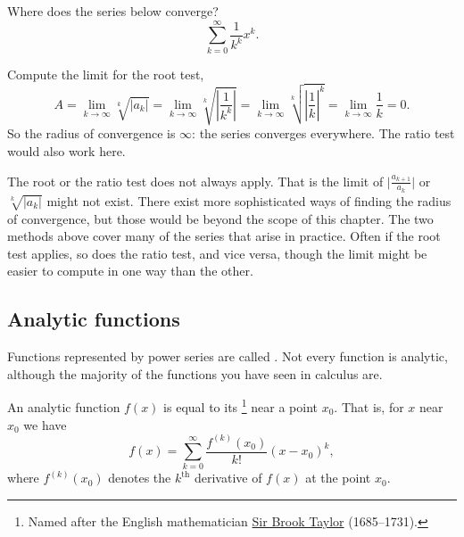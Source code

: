 \documentclass{ximera}
\begin{document}
\begin{example}
    Where does the series below converge?
    \begin{equation*}
        \sum_{k=0}^\infty \frac{1}{k^k} {x}^k .
    \end{equation*}
\end{example}

\begin{exampleSol}
    Compute the limit for the root test,
    \begin{equation*}
        A = \lim_{k\to\infty} \sqrt[k]{\lvert a_k \rvert} = \lim_{k\to\infty} \sqrt[k]{ \left\lvert\frac{1}{k^k}\right\rvert} 
        = \lim_{k\to\infty} \sqrt[k]{ {\left\lvert\frac{1}{k}\right\rvert}^{k}} = \lim_{k\to\infty} \frac{1}{k} = 0 .
    \end{equation*}
    So the radius of convergence is $\infty$: the series converges everywhere.  The ratio test would also work here.
\end{exampleSol}

The root or the ratio test does not always apply.  That is the limit of $\bigl \lvert \frac{a_{k+1}}{a_k} \bigr \rvert$ or $\sqrt[k]{\lvert a_k \rvert}$ might not exist. There exist more sophisticated ways of finding the radius of convergence, but those would be beyond the scope of this chapter.  The two methods above cover many of the series that arise in practice.  Often if the root test applies, so does the ratio test, and vice versa, though the limit might be easier to compute in one way than the other.

\subsection{Analytic functions}

Functions represented by power series are called \emph{}.  Not every function is analytic, although the majority of the functions you have seen in calculus are.

An analytic function $f(x)$ is equal to its \emph{}%
\footnote{
    Named after the English mathematician \href{http://en.wikipedia.org/wiki/Brook_Taylor}{Sir Brook Taylor} (1685--1731).
    } 
near a point $x_0$. That is, for $x$ near $x_0$ we have
\begin{equation} \label{ps:tayloreq}
    f(x) = \sum_{k=0}^\infty \frac{f^{(k)}(x_0)}{k!} {(x-x_0)}^k ,
\end{equation}
where $f^{(k)}(x_0)$ denotes the $k^{\text{th}}$ derivative of $f(x)$ at the point $x_0$.
\end{document}
